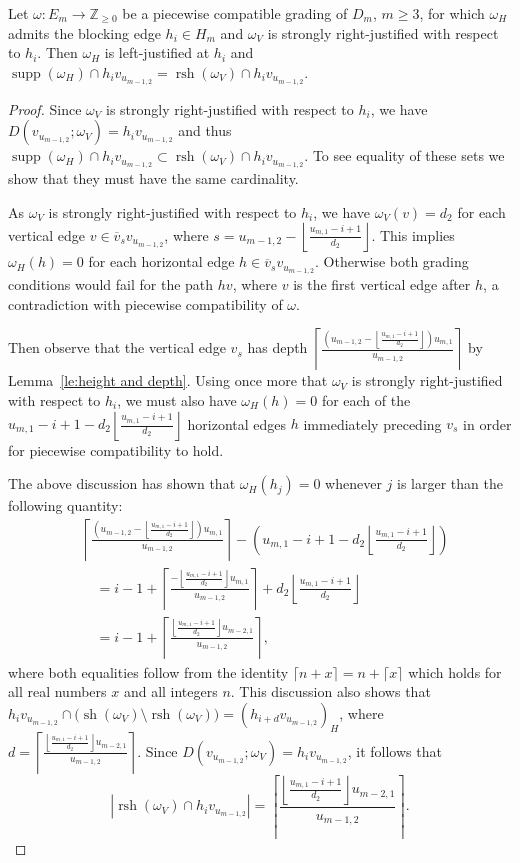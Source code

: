 \documentclass[ALCO,ThmDefs,Unicode,epreuves]{cedram}
\newcommand{\ZZ}{\mathbb{Z}}
\DeclareMathOperator{\supp}{supp}
\DeclareMathOperator{\rsh}{rsh}
\DeclareMathOperator{\sh}{sh}
\begin{document}
\begin{proposition}
 \label{prop:strong justification implication}
 Let $\omega:E_m\to\ZZ_{\ge0}$ be a piecewise compatible grading of $D_m$, $m\ge3$, for which $\omega_H$ admits the blocking edge $h_i\in H_m$ and $\omega_V$ is strongly right-justified with respect to $h_i$.
 Then $\omega_H$ is left-justified at $h_i$ and $\supp(\omega_H)\cap h_iv_{u_{m-1,2}}=\rsh(\omega_V)\cap h_iv_{u_{m-1,2}}$.
\end{proposition}
\begin{proof}
 Since $\omega_V$ is strongly right-justified with respect to $h_i$, we have $D(v_{u_{m-1,2}};\omega_V)=h_iv_{u_{m-1,2}}$ and thus $\supp(\omega_H)\cap h_iv_{u_{m-1,2}}\subset\rsh(\omega_V)\cap h_iv_{u_{m-1,2}}$.
 To see equality of these sets we show that they must have the same cardinality.

 As $\omega_V$ is strongly right-justified with respect to $h_i$, we have $\omega_V(v)=d_2$ for each vertical edge $v\in\overline{v}_sv_{u_{m-1,2}}$, where $s=u_{m-1,2}-\left\lfloor\frac{u_{m,1}-i+1}{d_2}\right\rfloor$.
 This implies $\omega_H(h)=0$ for each horizontal edge $h\in\overline{v}_sv_{u_{m-1,2}}$.
 Otherwise both grading conditions would fail for the path $hv$, where $v$ is the first vertical edge after $h$, a contradiction with piecewise compatibility of $\omega$.

 Then observe that the vertical edge $v_s$ has depth $\left\lceil\frac{\left(u_{m-1,2}-\left\lfloor\frac{u_{m,1}-i+1}{d_2}\right\rfloor\right)u_{m,1}}{u_{m-1,2}}\right\rceil$ by Lemma~\ref{le:height and depth}.
 Using once more that $\omega_V$ is strongly right-justified with respect to $h_i$, we must also have $\omega_H(h)=0$ for each of the $u_{m,1}-i+1-d_2\left\lfloor\frac{u_{m,1}-i+1}{d_2}\right\rfloor$ horizontal edges $h$ immediately preceding $v_s$ in order for piecewise compatibility to hold.

 The above discussion has shown that $\omega_H(h_j)=0$ whenever $j$ is larger than the following quantity:
 \begin{align*}
 &\left\lceil\frac{\left(u_{m-1,2}-\left\lfloor\frac{u_{m,1}-i+1}{d_2}\right\rfloor\right)u_{m,1}}{u_{m-1,2}}\right\rceil-\left(u_{m,1}-i+1-d_2\left\lfloor\frac{u_{m,1}-i+1}{d_2}\right\rfloor\right)\\
 &\quad=i-1+\left\lceil\frac{-\left\lfloor\frac{u_{m,1}-i+1}{d_2}\right\rfloor u_{m,1}}{u_{m-1,2}}\right\rceil+d_2\left\lfloor\frac{u_{m,1}-i+1}{d_2}\right\rfloor\\
 &\quad=i-1+\left\lceil\frac{\left\lfloor\frac{u_{m,1}-i+1}{d_2}\right\rfloor u_{m-2,1}}{u_{m-1,2}}\right\rceil,
 \end{align*}
 where both equalities follow from the identity $\lceil n+x\rceil=n+\lceil x\rceil$ which holds for all real numbers $x$ and all integers $n$.
 This discussion also shows that $h_iv_{u_{m-1,2}}\cap\big(\sh(\omega_V)\setminus\rsh(\omega_V)\big)=(h_{i+d}v_{u_{m-1,2}})_H$, where $d=\left\lceil\frac{\left\lfloor\frac{u_{m,1}-i+1}{d_2}\right\rfloor u_{m-2,1}}{u_{m-1,2}}\right\rceil$. 
 Since $D(v_{u_{m-1,2}};\omega_V)=h_iv_{u_{m-1,2}}$, it follows that 
 \[|\rsh(\omega_V)\cap h_iv_{u_{m-1,2}}|=\left\lceil\frac{\left\lfloor\frac{u_{m,1}-i+1}{d_2}\right\rfloor u_{m-2,1}}{u_{m-1,2}}\right\rceil.\]


\end{proof}
\end{document}
